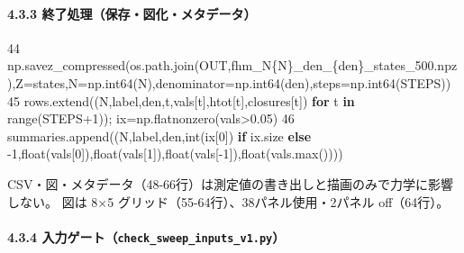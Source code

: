 \documentclass[
  a4paper,
]{ltjsarticle}
\newenvironment{Shaded}{}{}
\newcommand{\BuiltInTok}[1]{\textcolor[rgb]{0.00,0.50,0.00}{#1}}
\newcommand{\ControlFlowTok}[1]{\textcolor[rgb]{0.00,0.44,0.13}{\textbf{#1}}}
\newcommand{\DecValTok}[1]{\textcolor[rgb]{0.25,0.63,0.44}{#1}}
\newcommand{\FloatTok}[1]{\textcolor[rgb]{0.25,0.63,0.44}{#1}}
\newcommand{\KeywordTok}[1]{\textcolor[rgb]{0.00,0.44,0.13}{\textbf{#1}}}
\newcommand{\NormalTok}[1]{#1}
\newcommand{\OperatorTok}[1]{\textcolor[rgb]{0.40,0.40,0.40}{#1}}
\newcommand{\SpecialCharTok}[1]{\textcolor[rgb]{0.25,0.44,0.63}{#1}}
\newcommand{\SpecialStringTok}[1]{\textcolor[rgb]{0.73,0.40,0.53}{#1}}
\begin{document}
\paragraph{4.3.3
終了処理（保存・図化・メタデータ）}\label{ux7d42ux4e86ux51e6ux7406ux4fddux5b58ux56f3ux5316ux30e1ux30bfux30c7ux30fcux30bf}

\begin{Shaded}
\begin{Highlighting}[]
    \DecValTok{44}\NormalTok{          np.savez\_compressed(os.path.join(OUT,}\SpecialStringTok{f\textquotesingle{}hm\_N}\SpecialCharTok{\{}\NormalTok{N}\SpecialCharTok{\}}\SpecialStringTok{\_den\_}\SpecialCharTok{\{}\NormalTok{den}\SpecialCharTok{\}}\SpecialStringTok{\_states\_500.npz\textquotesingle{}}\NormalTok{),Z}\OperatorTok{=}\NormalTok{states,N}\OperatorTok{=}\NormalTok{np.int64(N),denominator}\OperatorTok{=}\NormalTok{np.int64(den),steps}\OperatorTok{=}\NormalTok{np.int64(STEPS))}
    \DecValTok{45}\NormalTok{          rows.extend((N,label,den,t,vals[t],htot[t],closures[t]) }\ControlFlowTok{for}\NormalTok{ t }\KeywordTok{in} \BuiltInTok{range}\NormalTok{(STEPS}\OperatorTok{+}\DecValTok{1}\NormalTok{))}\OperatorTok{;}\NormalTok{ ix}\OperatorTok{=}\NormalTok{np.flatnonzero(vals}\OperatorTok{\textgreater{}}\FloatTok{0.05}\NormalTok{)}
    \DecValTok{46}\NormalTok{          summaries.append((N,label,den,}\BuiltInTok{int}\NormalTok{(ix[}\DecValTok{0}\NormalTok{]) }\ControlFlowTok{if}\NormalTok{ ix.size }\ControlFlowTok{else} \OperatorTok{{-}}\DecValTok{1}\NormalTok{,}\BuiltInTok{float}\NormalTok{(vals[}\DecValTok{0}\NormalTok{]),}\BuiltInTok{float}\NormalTok{(vals[}\DecValTok{1}\NormalTok{]),}\BuiltInTok{float}\NormalTok{(vals[}\OperatorTok{{-}}\DecValTok{1}\NormalTok{]),}\BuiltInTok{float}\NormalTok{(vals.}\BuiltInTok{max}\NormalTok{())))}
\end{Highlighting}
\end{Shaded}

CSV・図・メタデータ（48-66行）は測定値の書き出しと描画のみで力学に影響しない。
図は 8×5 グリッド（55-64行）、38パネル使用・2パネル off（64行）。

\paragraph{\texorpdfstring{4.3.4
入力ゲート（\texttt{check\_sweep\_inputs\_v1.py}）}{4.3.4 入力ゲート（check\_sweep\_inputs\_v1.py）}}\label{ux5165ux529bux30b2ux30fcux30c8check_sweep_inputs_v1.py}
\end{document}
